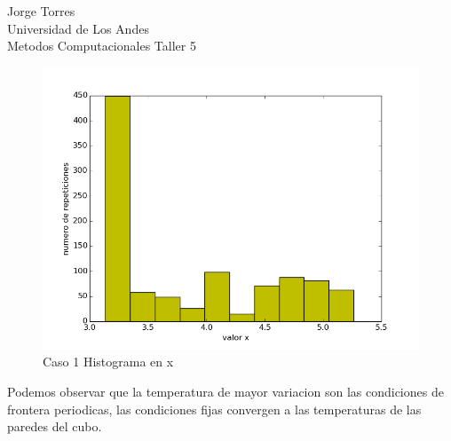 \documentclass{article}
\begin{document}
Jorge Torres\\
Universidad de Los Andes\\
Metodos Computacionales Taller 5\\
\vspace{1cm}

\begin{figure}[h!]
  \includegraphics[scale=0.5]{histrogramax.png}
  \caption{Caso 1 Histograma en x }
\end{figure}
Podemos observar que la temperatura de mayor variacion son las condiciones de frontera periodicas, las condiciones fijas convergen a las temperaturas de las paredes del cubo.\\




\end{document}
